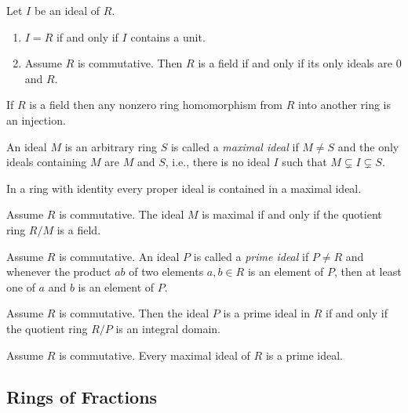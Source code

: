 \documentclass[../main]{subfiles}
\begin{document}
\begin{prop}
 Let $I$ be an ideal of $R$. 
 \begin{enumerate}
  \item $I = R$ if and only if $I$ contains a unit.
  
  \item Assume $R$ is commutative. Then $R$ is a field if and only if its only ideals are 0 and $R$.
 \end{enumerate}
\end{prop}


\begin{cor}
 If $R$ is a field then any nonzero ring homomorphism from $R$ into another ring is an injection.
\end{cor}


\begin{dfn}
 An ideal $M$ is an arbitrary ring $S$ is called a \textit{maximal ideal} if $M\neq S$ and the only ideals containing $M$ are $M$ and $S$, i.e., there is no ideal $I$ such that $M \subsetneq I \subsetneq S$. 
\end{dfn}


\begin{prop}
 In a ring with identity every proper ideal is contained in a maximal ideal.
\end{prop}


\begin{prop}
 Assume $R$ is commutative. The ideal $M$ is maximal if and only if the quotient ring $R/M$ is a field. 
\end{prop}


\begin{dfn}
 Assume $R$ is commutative. An ideal $P$ is called a \textit{prime ideal} if $P \neq R$ and whenever the product $ab$ of two elements $a,b\in R$ is an element of $P$, then at least one of $a$ and $b$ is an element of $P$.
\end{dfn}


\begin{prop}
 Assume $R$ is commutative. Then the ideal $P$ is a prime ideal in $R$ if and only if the quotient ring $R/P$ is an integral domain.
\end{prop}


\begin{cor}
 Assume $R$ is commutative. Every maximal ideal of $R$ is a prime ideal.
\end{cor}


\subsection{Rings of Fractions}
\end{document}
